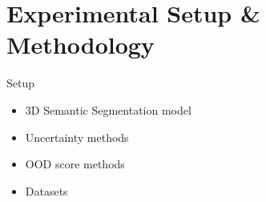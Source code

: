\documentclass[aspectratio=169]{beamer}
\begin{document}
\section{Experimental Setup \& Methodology}
\begin{frame}[noframenumbering]{Setup}
    \begin{itemize}

        \item 3D Semantic Segmentation model
        \item Uncertainty methods
        \item OOD score methods
        \item Datasets
    \end{itemize}
\end{frame}
\end{document}
